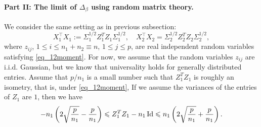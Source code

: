 \paragraph{Part II: The limit of $\Delta_{\beta}$ using random matrix theory.}
We consider the same setting as in previous subsection: 
$$ X_1^{\top}X_1:=\Sigma_1^{1/2}  Z_1^T Z_1 \Sigma_1^{1/2} ,\quad X_2^{\top}X_2= \Sigma_2^{1/2}  Z_2^T Z_2 \Sigma_2^{1/2},$$
where $z_{ij}$, $1 \leq i \leq n_1+n_2\equiv n$, $1 \leq j \leq p$, are real independent random variables satisfying \eqref{eq_12moment}. For now, we assume that the random variables $z_{ij}$ are i.i.d. Gaussian, but we know that universality holds for generally distributed entries. Assume that $p/n_1$ is a small number such that $Z_1^TZ_1$ is roughly an isometry, that is, under \eqref{eq_12moment}, 
{\color{blue}
If we assume the variances of the entries of $Z_1$ are $1$, then we have
\begin{align}
- {n_1} \left(2\sqrt{\frac{p}{n_1}} - {\frac{p}{n_1}}\right)  \leqslant {Z_1^T Z_1 -  n_1 \operatorname{Id}}  \leqslant {n_1} \left(2\sqrt{\frac{p}{n_1}} + {\frac{p}{n_1}}\right) . \label{eq_isometric}
\end{align}
}

